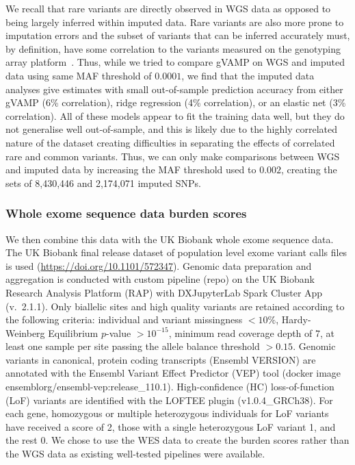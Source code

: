 We recall that rare variants are directly observed in WGS data as opposed to being largely inferred within imputed data. Rare variants are also more prone to imputation errors and the subset of variants that can be inferred accurately must, by definition, have some correlation to the variants measured on the genotyping array platform~\cite{Si2021-xh}. Thus, while we tried to compare gVAMP on WGS and imputed data using same MAF threshold of $0.0001$, we find that the imputed data analyses give estimates with small out-of-sample prediction accuracy from either gVAMP (6\% correlation), ridge regression (4\% correlation), or an elastic net (3\% correlation). All of these models appear to fit the training data well, but they do not generalise well out-of-sample, and this is likely due to the highly correlated nature of the dataset creating difficulties in separating the effects of correlated rare and common variants. Thus, we can only make comparisons between WGS and imputed data by increasing the MAF threshold used to $0.002$, creating the sets of 8,430,446 and 2,174,071 imputed SNPs. 

\subsubsection{Whole exome sequence data burden scores}
We then combine this data with the UK Biobank whole exome sequence data. The UK Biobank final release dataset of population level exome variant calls files is used (\url{https://doi.org/10.1101/572347}). Genomic data preparation and aggregation is conducted with custom pipeline (repo) on the UK Biobank Research Analysis Platform (RAP) with DXJupyterLab Spark Cluster App (v.\ 2.1.1). Only biallelic sites and high quality variants are retained according to the following criteria: individual and variant missingness $<10\%$, Hardy-Weinberg Equilibrium $p$-value $>10^{-15}$, minimum read coverage depth of 7, at least one sample per site passing the allele balance threshold $>0.15$. Genomic variants in canonical, protein coding transcripts (Ensembl VERSION) are annotated with the Ensembl Variant Effect Predictor (VEP) tool (docker image ensemblorg/ensembl-vep:release\_110.1). High-confidence (HC) loss-of-function (LoF) variants are identified with the LOFTEE plugin (v1.0.4\_GRCh38). For each gene, homozygous or multiple heterozygous individuals for LoF variants have received a score of 2, those with a single heterozygous LoF variant 1, and the rest 0. We chose to use the WES data to create the burden scores rather than the WGS data as existing well-tested pipelines were available.


